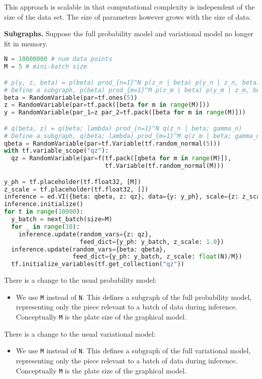 This approach is scalable in that computational complexity is
independent of the size of the data set. The size of parameters
however grows with the size of data.

\textbf{Subgraphs.}
Suppose the full probability model and variational model no longer fit
in memory.
\begin{lstlisting}[language=Python]
N = 10000000 # num data points
M = 5 # mini-batch size

# p(y, z, beta) = p(beta) prod_{n=1}^N p(z_n | beta) p(y_n | z_n, beta)
# Define a subgraph, p(beta) prod_{m=1}^M p(z_m | beta) p(y_m | z_m, beta)
beta = RandomVariable(par=tf.ones(5))
z = RandomVariable(par=tf.pack([beta for m in range(M)]))
y = RandomVariable(par_1=z par_2=tf.pack([beta for m in range(M)]))

# q(beta, z) = q(beta; lambda) prod_{n=1}^N q(z_n | beta; gamma_n)
# Define a subgraph, q(beta; lambda) prod_{m=1}^M q(z_m | beta; gamma_m)
qbeta = RandomVariable(par=tf.Variable(tf.random_normal(5)))
with tf.variable_scope("qz"):
  qz = RandomVariable(par=f(tf.pack([qbeta for m in range(M)]),
                            tf.Variable(tf.random_normal(M)))

y_ph = tf.placeholder(tf.float32, [M])
z_scale = tf.placeholder(tf.float32, [])
inference = ed.VI({beta: qbeta, z: qz}, data={y: y_ph}, scale={z: z_scale})
inference.initialize()
for t in range(10000):
  y_batch = next_batch(size=M)
  for _ in range(10):
    inference.update(random_vars={z: qz},
                     feed_dict={y_ph: y_batch, z_scale: 1.0})
  inference.update(random_vars={beta: qbeta},
                   feed_dict={y_ph: y_batch, z_scale: float(N)/M})
  tf.initialize_variables(tf.get_collection("qz"))
\end{lstlisting}
There is a change to the usual probability model:
\begin{itemize}
\item
  We use \texttt{M} instead of \texttt{N}. This defines a subgraph of the full
  probability model, representing only the piece relevant to a batch of
  data during inference. Conceptually \texttt{M} is the plate size of the
  graphical model.
\end{itemize}

There is a change to the usual variational model:
\begin{itemize}
\item
  We use \texttt{M} instead of \texttt{N}. This defines a subgraph of the full
  variational model, representing only the piece relevant to a batch of
  data during inference. Conceptually \texttt{M} is the plate size of the
  graphical model.
\end{itemize}

